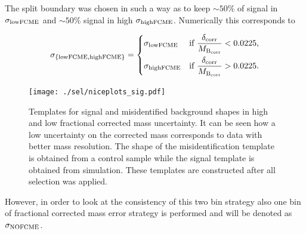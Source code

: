 The split boundary was chosen in such a way as to keep $\sim50\%$ of signal in $\sigma_{\rm{lowFCME}}$ and $\sim50\%$ signal in high $\sigma_{\rm{highFCME}}$.
Numerically this corresponds to 

\begin{equation}
\sigma_{\rm{\{lowFCME,highFCME\}}}=
   \begin{dcases}
	   \sigma_{\rm{lowFCME}} &\text{if  }  \frac{\delta_\mathrm{{corr}}}{M_{\mathrm{B_{corr}}}} < 0.0225,\\
	  \sigma_{\rm{highFCME}} &\text{if  }  \frac{\delta_\mathrm{{corr}}}{M_{\mathrm{B_{corr}}}} > 0.0225. 
   \end{dcases}
\label{eq:impsplit}
\end{equation}

\begin{figure}[H]
\centering
        \texttt{[image: ./sel/niceplots\_sig.pdf]}
        \caption{Templates for signal and misidentified background
          shapes in high and low fractional corrected mass
          uncertainty. It can be seen how a low uncertainty on the
          corrected mass corresponds to data with better mass
          resolution. The shape of the misidentification template is
          obtained from a control sample while the signal template is
          obtained from simulation. These templates are constructed after all selection was applied.}
\label{fig:resofit}
\end{figure}


However, in order to look at the consistency of this two bin strategy also one bin of fractional corrected mass error strategy is performed and will be denoted as $\sigma_{\rm{NOFCME}}$.

